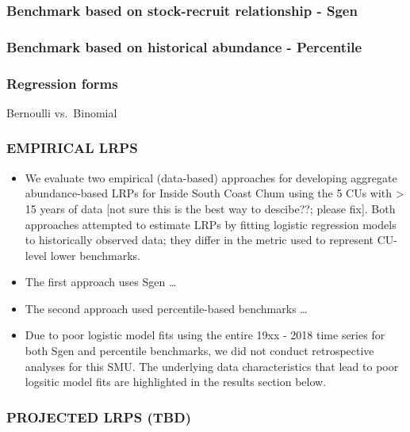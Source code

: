 \documentclass[11pt]{book}
\begin{document}
\hypertarget{benchmark-based-on-stock-recruit-relationship---sgen}{%
\subsubsection{Benchmark based on stock-recruit relationship - Sgen}\label{benchmark-based-on-stock-recruit-relationship---sgen}}

\hypertarget{benchmark-based-on-historical-abundance---percentile}{%
\subsubsection{Benchmark based on historical abundance - Percentile}\label{benchmark-based-on-historical-abundance---percentile}}

\hypertarget{regression-forms}{%
\subsubsection{Regression forms}\label{regression-forms}}

Bernoulli vs.~Binomial

\hypertarget{empirical-lrps-2}{%
\subsubsection{EMPIRICAL LRPS}\label{empirical-lrps-2}}
\begin{itemize}
\item
  We evaluate two empirical (data-based) approaches for developing aggregate abundance-based LRPs for Inside South Coast Chum using the 5 CUs with \textgreater{} 15 years of data {[}not sure this is the best way to descibe??; please fix{]}. Both approaches attempted to estimate LRPs by fitting logistic regression models to historically observed data; they differ in the metric used to represent CU-level lower benchmarks.
\item
  The first approach uses Sgen \ldots{}
\item
  The second approach used percentile-based benchmarks \ldots{}
\item
  Due to poor logistic model fits using the entire 19xx - 2018 time series for both Sgen and percentile benchmarks, we did not conduct retrospective analyses for this SMU. The underlying data characteristics that lead to poor logsitic model fits are highlighted in the results section below.
\end{itemize}
\hypertarget{projected-lrps-tbd}{%
\subsubsection{PROJECTED LRPS (TBD)}\label{projected-lrps-tbd}}
\end{document}
